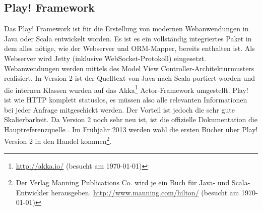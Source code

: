 \subsection{Play! Framework}
Das Play! Framework ist für die Erstellung von modernen Webanwendungen in Java oder Scala entwickelt worden. Es ist es ein vollständig integriertes Paket in dem alles nötige, wie der Webserver und ORM-Mapper, bereits enthalten ist. Als Webserver wird Jetty (inklusive WebSocket-Protokoll) eingesetzt. Webanwendungen werden mittels des Model View Controller-Architekturmusters realisiert. In Version 2 ist der Quelltext von Java nach Scala portiert worden und die internen Klassen wurden auf das Akka\footnote{\url{http://akka.io/} (besucht am \today)} Actor-Framework umgestellt. Play! ist wie HTTP komplett statuslos, es müssen also alle relevanten Informationen bei jeder Anfrage mitgeschickt werden. Der Vorteil ist jedoch die sehr gute Skalierbarkeit. Da Version 2 noch sehr neu ist, ist die offizielle Dokumentation die Hauptreferenzquelle \autocite{PlayDoku}. Im Frühjahr 2013 werden wohl die ersten Bücher über Play! Version 2 in den Handel kommen\footnote{Der Verlag Manning Publications Co. wird je ein Buch für Java- und Scala-Entwickler herausgeben. \url{http://www.manning.com/hilton/} (besucht am \today)}.

